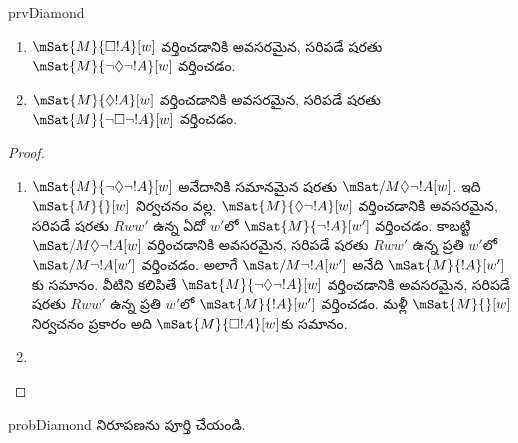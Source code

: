 \documentclass[../../../include/open-logic-section]{subfiles}
\begin{document}
\begin{tagblock}{prvDiamond}
\begin{prop}
  \begin{enumerate}
  \item $\mSat{M}{\Box !A}[w]$ వర్తించడానికి అవసరమైన, సరిపడే షరతు
    $\mSat{M}{\lnot\Diamond\lnot !A}[w]$ వర్తించడం.
  \item $\mSat{M}{\Diamond !A}[w]$ వర్తించడానికి అవసరమైన, సరిపడే షరతు
    $\mSat{M}{\lnot\Box\lnot !A}[w]$ వర్తించడం.
  \end{enumerate}
\end{prop}

\begin{proof}
  \begin{enumerate}
    \item $\mSat{M}{\lnot\Diamond\lnot !A}[w]$
      అనేదానికి సమానమైన షరతు
      $\mSat/{M}{\Diamond\lnot !A}[w]$.
      ఇది $\mSat{M}{}[w]$ నిర్వచనం వల్ల.
      $\mSat{M}{\Diamond\lnot !A}[w]$
      వర్తించడానికి అవసరమైన, సరిపడే షరతు
      $Rww'$ ఉన్న ఏదో $w'$లో
      $\mSat{M}{\lnot !A}[w']$ వర్తించడం.
      కాబట్టి
      $\mSat/{M}{\Diamond\lnot !A}[w]$
      వర్తించడానికి అవసరమైన, సరిపడే షరతు
      $Rww'$ ఉన్న ప్రతి $w'$లో
      $\mSat/{M}{\lnot !A}[w']$ వర్తించడం.
      అలాగే $\mSat/{M}{\lnot !A}[w']$
      అనేది
      $\mSat{M}{!A}[w']$కు సమానం.
      వీటిని కలిపితే
      $\mSat{M}{\lnot\Diamond\lnot !A}[w]$
      వర్తించడానికి అవసరమైన, సరిపడే షరతు
      $Rww'$ ఉన్న ప్రతి $w'$లో
      $\mSat{M}{!A}[w']$ వర్తించడం.
      మళ్లీ $\mSat{M}{}[w]$
      నిర్వచనం ప్రకారం అది
      $\mSat{M}{\Box !A}[w]$కు
      సమానం.
    \item {}
  \end{enumerate}
\end{proof}

\begin{probtag}{probDiamond}
  నిరూపణను పూర్తి చేయండి.
\end{probtag}
\end{tagblock}
\end{document}
